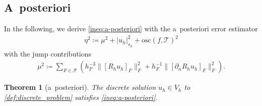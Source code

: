\documentclass[a4paper]{amsart}
\numberwithin{equation}{section}
\def\F{\mathcal{F}}
\def\T{\mathcal{T}}
\def\pw{\mathrm{pw}}
\newtheorem{theorem}{Theorem}[section]
\theoremstyle{definition}
\theoremstyle{remark}
\numberwithin{theorem}{section}
\numberwithin{equation}{section}
\numberwithin{table}{section}
\numberwithin{figure}{section}
\begin{document}
\subsection{A~posteriori}
In the following, we derive \eqref{ineq:a-posteriori} with the a~posteriori error estimator
\begin{align}\label{def:eta}
	\eta^2 \coloneqq \mu^2 + |u_h|^2_{s_h} + \mathrm{osc}(f,\mathcal{T})^2
\end{align}
with the jump contributions
\begin{align}\label{def:mu}
	\mu^2 \coloneqq \sum_{F \in \F} (h_F^{-3} \|[R_h u_h]_F\|^2_F + h_F^{-1} \|[\partial_n R_h u_h]_F\|_F^2).
\end{align}
\begin{theorem}[a~posteriori]\label{thm:a-posteriori}
    The discrete solution $u_h \in V_h$ to \eqref{def:discrete_problem} satisfies \eqref{ineq:a-posteriori}.
\end{theorem}
\end{document}
